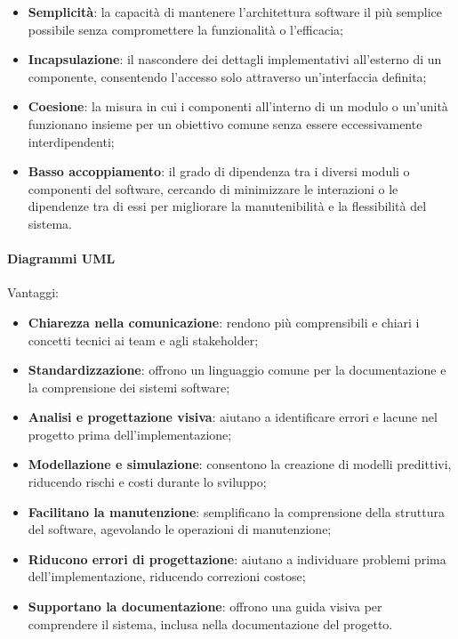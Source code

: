 \begin{itemize}
    \item \textbf{Semplicità}: la capacità di mantenere l'architettura software il più semplice possibile senza compromettere la funzionalità o l'efficacia;
    \item \textbf{Incapsulazione}: il nascondere dei dettagli implementativi all'esterno di un componente, consentendo l'accesso solo attraverso un'interfaccia definita;
    \item \textbf{Coesione}: la misura in cui i componenti all'interno di un modulo o un'unità funzionano insieme per un obiettivo comune senza essere eccessivamente interdipendenti;
    \item \textbf{Basso accoppiamento}: il grado di dipendenza tra i diversi moduli o componenti del software, cercando di minimizzare le interazioni o le dipendenze tra di essi per migliorare la manutenibilità e la flessibilità del sistema.
\end{itemize}

\paragraph{Diagrammi UML}
Vantaggi:
\begin{itemize}
    \item \textbf{Chiarezza nella comunicazione}: rendono più comprensibili e chiari i concetti tecnici ai team e agli stakeholder;
    \item \textbf{Standardizzazione}: offrono un linguaggio comune per la documentazione e la comprensione dei sistemi software;
    \item \textbf{Analisi e progettazione visiva}: aiutano a identificare errori e lacune nel progetto prima dell'implementazione;
    \item \textbf{Modellazione e simulazione}: consentono la creazione di modelli predittivi, riducendo rischi e costi durante lo sviluppo;
    \item \textbf{Facilitano la manutenzione}: semplificano la comprensione della struttura del software, agevolando le operazioni di manutenzione;
    \item \textbf{Riducono errori di progettazione}: aiutano a individuare problemi prima dell'implementazione, riducendo correzioni costose;
    \item \textbf{Supportano la documentazione}: offrono una guida visiva per comprendere il sistema, inclusa nella documentazione del progetto.
\end{itemize}

